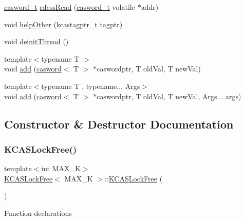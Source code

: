 \begin{DoxyCompactItemize}
\item 
\hyperlink{rq__unsafe_8h_ad45142aaf2ff20a036dc6242b8483e9c}{casword\+\_\+t} \hyperlink{classKCASLockFree_a0d29756cf4f43e7f138cea73b2f781b5}{rdcss\+Read} (\hyperlink{rq__unsafe_8h_ad45142aaf2ff20a036dc6242b8483e9c}{casword\+\_\+t} volatile $\ast$addr)
\item 
void \hyperlink{classKCASLockFree_ae587033414b12de35c07b6c13fe434bd}{help\+Other} (\hyperlink{kcas__reuse__impl_8h_a22868433cf4300ce32f000ed8c8dd76c}{kcastagptr\+\_\+t} tagptr)
\item 
void \hyperlink{classKCASLockFree_a703c5cf96094b2e49c5e23f199292915}{deinit\+Thread} ()
\item 
{\footnotesize template$<$typename T $>$ }\\void \hyperlink{classKCASLockFree_a01b56610d605c4ca1759c1f4c8c28d6e}{add} (\hyperlink{structcasword}{casword}$<$ T $>$ $\ast$caswordptr, T old\+Val, T new\+Val)
\item 
{\footnotesize template$<$typename T , typename... Args$>$ }\\void \hyperlink{classKCASLockFree_ac12d23ced3ca079ca65ea8896405678a}{add} (\hyperlink{structcasword}{casword}$<$ T $>$ $\ast$caswordptr, T old\+Val, T new\+Val, Args... args)
\end{DoxyCompactItemize}


\subsection{Constructor \& Destructor Documentation}
\mbox{\label{classKCASLockFree_a766a5a353ea5229f9dadb61076c06c14}} 
\subsubsection{\texorpdfstring{K\+C\+A\+S\+Lock\+Free()}{KCASLockFree()}}
{\footnotesize\ttfamily template$<$int M\+A\+X\+\_\+K$>$ \\
\hyperlink{classKCASLockFree}{K\+C\+A\+S\+Lock\+Free}$<$ M\+A\+X\+\_\+K $>$\+::\hyperlink{classKCASLockFree}{K\+C\+A\+S\+Lock\+Free} (\begin{DoxyParamCaption}{ }\end{DoxyParamCaption})}

Function declarations 

